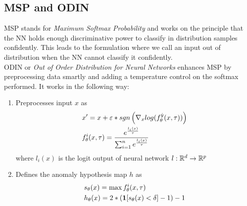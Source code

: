 \documentclass[11pt]{report}
\begin{document}
\subsection{MSP and ODIN}
MSP stands for \emph{Maximum Softmax Probability} and works on the principle that the NN holds enough discriminative power to classify in distribution samples confidently. This leads to the formulation where we call an input out of distribution when the NN cannot classify it confidently. 
\vspace{1mm}
\\ODIN or \emph{Out of Order Distribution for Neural Networks} enhances MSP by preprocessing data smartly and adding a temperature control on the softmax performed. It works in the following way:
\vspace{1mm}
\begin{enumerate}
    \item \label{mpp:gen_0} Preprocesses input \(x\) as
    \begin{align}
        \begin{aligned}
          & x'=x+\varepsilon * sgn \left( \nabla_x log(f_\theta^{\hat{y}}(x,\tau)) \right)\\
          & f_\theta^i(x,\tau) = \frac{e^{\frac{l_i(x)}{\tau}}}{\sum_{i=1}^n e^{\frac{l_i(x)}{\tau}}}
        \end{aligned} \nonumber
    \end{align}
where \(l_i(x)\) is the logit output of neural network \(l: \mathbb{R}^d \rightarrow \mathbb{R}^p \)


\item \label{mpp:gen_1} Defines the anomaly hypothesis map \(h\) as 
     \begin{align}
        \begin{aligned}
          & s_\theta(x)= \max f_\theta^i(x,\tau) \\
          & h_\theta(x)= 2 * \left( \mathbf{1}[s_\theta(x) < \delta] - 1 \right) -1
        \end{aligned} \nonumber
    \end{align}
\end{enumerate}
\end{document}
